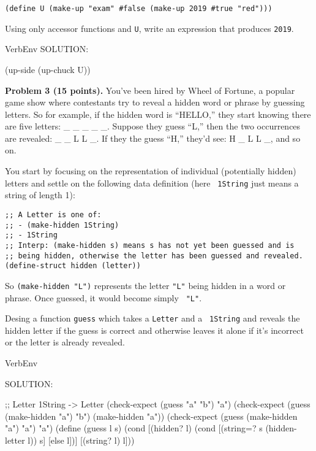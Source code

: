 \documentclass[12pt]{article}
\begin{document}
\vspace{3in}
\begin{verbatim}
(define U (make-up "exam" #false (make-up 2019 #true "red")))
\end{verbatim}
Using only accessor functions and {\tt U}, write an expression that
produces {\tt 2019}.

\begin{SaveVerbatim}{VerbEnv}  
SOLUTION:

(up-side (up-chuck U))
\end{SaveVerbatim}


\newpage

\noindent
{\bf Problem 3 (15 points).}
%
You've been hired by Wheel of Fortune, a popular game show where
contestants try to reveal a hidden word or phrase by guessing letters.
So for example, if the hidden word is ``HELLO,'' they start knowing
there are five letters: \_ \_ \_ \_ \_.  Suppose they guess ``L,''
then the two occurrences are revealed: \_ \_ L L \_.  If they the
guess ``H,'' they'd see: H \_ L L \_, and so on.

You start by focusing on the representation of individual (potentially
hidden) letters and settle on the following data definition (here {\tt
  1String} just means a string of length 1):
\begin{verbatim}
;; A Letter is one of:
;; - (make-hidden 1String)
;; - 1String
;; Interp: (make-hidden s) means s has not yet been guessed and is 
;; being hidden, otherwise the letter has been guessed and revealed.
(define-struct hidden (letter))
\end{verbatim}
So {\tt (make-hidden "L")} represents the letter {\tt "L"} being 
hidden in a word or phrase.  Once guessed, it would become simply {\tt
  "L"}.

Desing a function {\tt guess} which takes a {\tt Letter} and a {\tt
  1String} and reveals the hidden letter if the guess is correct and
otherwise leaves it alone if it's incorrect or the letter is already
revealed.


\begin{SaveVerbatim}{VerbEnv}

SOLUTION:

;; Letter 1String -> Letter
(check-expect (guess "a" "b") "a")
(check-expect (guess (make-hidden "a") "b") (make-hidden "a"))
(check-expect (guess (make-hidden "a") "a") "a")
(define (guess l s)
  (cond [(hidden? l) 
         (cond [(string=? s (hidden-letter l)) s]
               [else l])]
        [(string? l) l]))
\end{SaveVerbatim}
\end{document}
